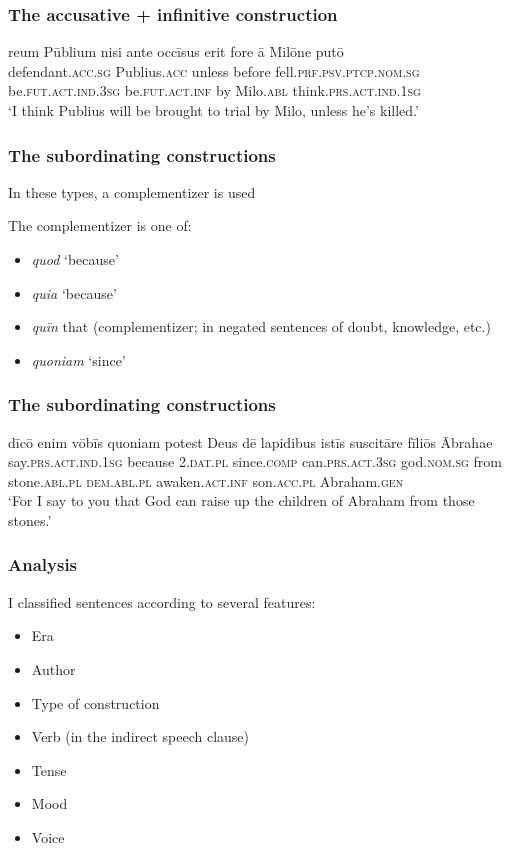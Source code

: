 \documentclass{beamer}
\begin{document}
\begin{frame}
\frametitle{The accusative + infinitive construction}
\begin{exe}
\ex
\gll reum Pūblium nisi ante occīsus erit fore ā Milōne putō\\
defendant.\textsc{acc.sg} Publius.\textsc{acc} unless before fell.\textsc{prf.psv.ptcp.nom.sg} be.\textsc{fut.act.ind.3sg} be.\textsc{fut.act.inf} by Milo.\textsc{abl} think.\textsc{prs.act.ind.1sg}\\
\trans `I think Publius will be brought to trial by Milo, unless he's killed.'
\end{exe}

\end{frame}

\begin{frame}
\frametitle{The subordinating constructions}
In these types, a complementizer is used

The complementizer is one of:
\begin{itemize}
    \item \textit{quod} `because'
    \item \textit{quia} `because'
    \item \textit{quīn} that (complementizer; in negated sentences of doubt, knowledge, etc.)
    \item \textit{quoniam} `since'
\end{itemize}
\end{frame}

\begin{frame}
\frametitle{The subordinating constructions}
\begin{exe}
\ex
\gll dīcō enim vōbīs quoniam potest Deus dē lapidibus istīs suscitāre fīliōs Ābrahae\\
say.\textsc{prs.act.ind}.1\textsc{sg} because 2\textsc{.dat.pl} since.\textsc{comp} can.\textsc{prs.act.3sg} god.\textsc{nom.sg} from stone.\textsc{abl.pl} \textsc{dem.abl.pl} awaken.\textsc{act.inf} son.\textsc{acc.pl} Abraham.\textsc{gen}\\
\trans `For I say to you that God can raise up the children of Abraham from those stones.'
\end{exe}
\end{frame}

\begin{frame}
\frametitle{Analysis}
I classified sentences according to several features:
\begin{itemize}
    \item Era
    \item Author
    \item Type of construction
    \item Verb (in the indirect speech clause)
    \item Tense
    \item Mood
    \item Voice
\end{itemize}

\end{frame}
\end{document}
